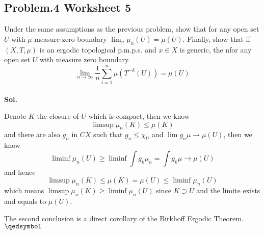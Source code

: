 \documentclass[lang=en,11pt,a4paper,citestyle =authoryear]{elegantpaper}
\newcommand{\prvd}{$\hfill \qedsymbol$}
\begin{document}
\subsection*{Problem.4 Worksheet 5} 
Under the same assumptions as the previous problem, show that for any open set $U$ with $\mu$-measure zero boundary $\lim_n \mu_n(U) = \mu(U)$. Finally, show that if $(X,T,\mu)$ is an ergodic topological p.m.p.s. and $x\in X$ is generic, the nfor any open set $U$ with measure zero boundary
\[\lim_{n\to\infty} \dfrac{1}{n}\sum\limits_{i=1}^n \mu(T^{-k}(U)) = \mu(U)\]
\vspace{0.5em}\\
\textbf{Sol.} \par
    Denote $K$ the closure of $U$ which is compact, then we know
    \[\limsup \mu_n(K) \leq \mu(K)\]
    and there are also $g_n$ in $CX$ such that $g_n \leq \chi_U$ and $\lim g_n \mu \to \mu(U)$, then we know 
    \[\liminf \mu_n(U) \geq \liminf \int g_k \mu_n = \int g_k\mu \to \mu(U)\]
    and hence
    \[\limsup \mu_n(K) \leq \mu(K) = \mu(U) \leq \liminf \mu_n(U)\]
    which means $\limsup \mu_n(K) \geq \liminf \mu_n(U)$ since $K\supset U$ and the limite exists and equals to $\mu(U)$.\par
    The second conclusion is a direct corollary of the Birkhoff Ergodic Theorem.
\prvd
\vspace{0.5em}
\end{document}

